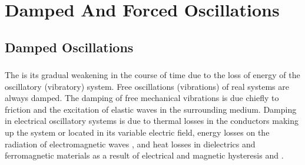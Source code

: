 





\chapter{Damped And Forced Oscillations}
\label{ch-29}

\section{Damped Oscillations}
\label{sec-29.1} 

\subsection{}\label{29.1.1} The  is its gradual weakening in the course of time due to the loss of energy of the oscillatory (vibratory) system. Free oscillations (vibrations) of real systems are always damped. The damping of free mechanical vibrations is due chiefly to friction and the excitation of elastic waves  in the surrounding medium. Damping in electrical oscillatory systems is due to thermal losses in the conductors making up the system or located in its variable electric field, energy losses on the radiation of electromagnetic waves , and heat losses in dielectrics and ferromagnetic materials as a result of electrical and magnetic hysteresis  and .

